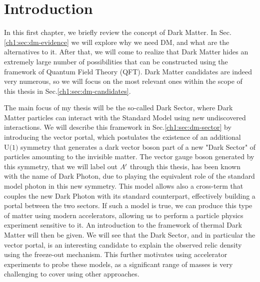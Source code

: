 
\newcommand{\pdirone}{chapters/plots/chapter1}


\chapter{Introduction} %

\label{chapter1}

In this first chapter, we briefly review the concept of Dark Matter. In Sec.\ref{ch1:sec:dm-evidence} we will explore why we need DM, and what are the alternatives to it. After that, we will come to realize that Dark Matter hides an extremely large number of possibilities that can be constructed using the framework of Quantum Field Theory (QFT). Dark Matter candidates are indeed very numerous, so we will focus on the most relevant ones within the scope of this thesis in Sec.\ref{ch1:sec:dm-candidates}.

The main focus of my thesis will be the so-called Dark Sector, where Dark Matter particles can interact with the Standard Model using new undiscovered interactions. We will describe this framework in Sec.\ref{ch1:sec:dm-sector}  by introducing the vector portal, which postulates the existence of an additional $\textrm{U(1)}$ symmetry that generates a dark vector boson part of a new "Dark Sector" of particles amounting to the invisible matter. The vector gauge boson generated by this symmetry, that we will label out $A'$ through this thesis, has been known with the name of Dark Photon, due to playing the equivalent role of the standard model photon in this new symmetry. This model allows also a cross-term that couples the new Dark Photon with its standard counterpart, effectively building a portal between the two sectors. If such a model is true, we can produce this type of matter using modern accelerators, allowing us to perform a particle physics experiment sensitive to it. An introduction to the framework of thermal Dark Matter will then be given. We will see that the Dark Sector, and in particular the vector portal, is an interesting candidate to explain the observed relic density using the freeze-out mechanism. This further motivates using accelerator experiments to probe these models, as a significant range of masses is very challenging to cover using other approaches.


